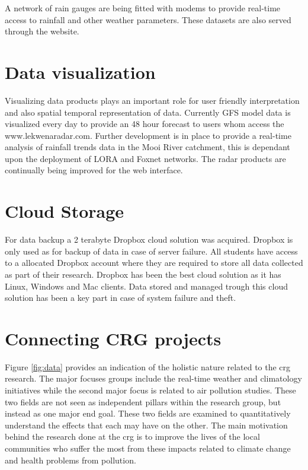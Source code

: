 \documentclass{wrcreport}
\begin{document}
A network of rain gauges are being fitted with modems to provide
real-time access to rainfall and other weather parameters. These
datasets are also served through the website.

\section{Data visualization}
Visualizing data products plays an important role for user friendly interpretation
and also spatial temporal representation of data. Currently GFS model data is
visualized every day to provide an 48 hour forecast to users whom access the
www.lekwenaradar.com. Further development is in place to provide a real-time
analysis of rainfall trends data in the Mooi River catchment, this is dependant upon
the deployment of LORA and Foxnet networks. The
radar products are continually being improved for the web interface.

\section{Cloud Storage}
For data backup a 2 terabyte Dropbox cloud solution was acquired.
Dropbox is only used as for backup of data in case of server failure.
All students have access to a allocated Dropbox account where they are
required to store all data collected as part of their research.
Dropbox has been the best cloud solution as it has Linux, Windows and
Mac clients. Data stored and managed trough this cloud solution has
been a key part in case of system failure and theft.

\section{Connecting CRG projects}
Figure \ref{fig:data} provides an indication of the holistic nature
related to the \gls{crg} research.  The major focuses groups include
the real-time weather and climatology initiatives while the second
major focus is related to air pollution studies. These two fields are
not seen as independent pillars within the research group, but instead
as one major end goal. These two fields are examined to quantitatively
understand the effects that each may have on the other.  The main
motivation behind the research done at the \gls{crg} is to improve the
lives of the local communities who suffer the most from these impacts
related to climate change and health problems from pollution.
\end{document}
